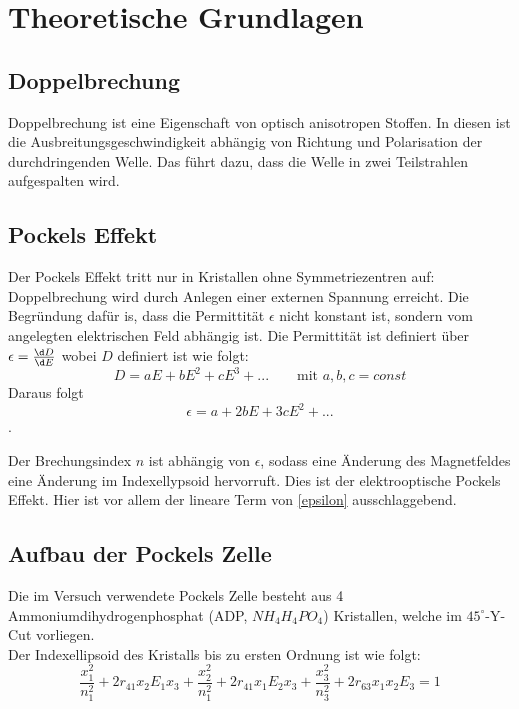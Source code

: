 \section{Theoretische Grundlagen}
\subsection{Doppelbrechung}
Doppelbrechung ist eine Eigenschaft von optisch anisotropen Stoffen. In diesen ist die Ausbreitungsgeschwindigkeit abhängig von Richtung und Polarisation der durchdringenden Welle. Das führt dazu, dass die Welle in zwei Teilstrahlen aufgespalten wird.


\subsection{Pockels Effekt}
Der Pockels Effekt tritt nur in Kristallen ohne Symmetriezentren auf: Doppelbrechung wird durch Anlegen einer externen Spannung erreicht.
Die Begründung dafür is, dass die Permittität $\epsilon$ nicht konstant ist, sondern vom angelegten elektrischen Feld abhängig ist. 
Die Permittität ist definiert über $\epsilon = \frac{\d D}{\d E}$ wobei $D$ definiert ist wie folgt: 
\begin{equation}
D = aE +bE^2+cE^3+... \qquad \textrm{mit } a,b,c = const
\end{equation}
Daraus folgt
\begin{equation}\label{epsilon}
\epsilon = a + 2bE + 3cE^2 + ...
\end{equation}.\par
Der Brechungsindex $n$ ist abhängig von $\epsilon$, sodass eine Änderung des Magnetfeldes eine Änderung im Indexellypsoid hervorruft. Dies ist der elektrooptische Pockels Effekt. Hier ist vor allem der lineare Term von \ref{epsilon} ausschlaggebend.
\subsection{Aufbau der Pockels Zelle}
Die im Versuch verwendete Pockels Zelle besteht aus 4 Ammoniumdihydrogenphosphat (ADP, $NH_4H_4PO_4$) Kristallen, welche im $45^\circ$-Y-Cut vorliegen.\\
Der Indexellipsoid  des Kristalls bis zu ersten Ordnung ist wie folgt:
\begin{equation}
	\frac{x_1^2}{n_1^2} + 2 r_{41} x_2 E_1 x_3 + \frac{x_2^2}{n_1^2}+ 2 r_{41} x_1 E_2 x_3 + \frac{x_3^2}{n_3^2} +  2 r_{63} x_1 x_2 E_3 = 1
\end{equation}

